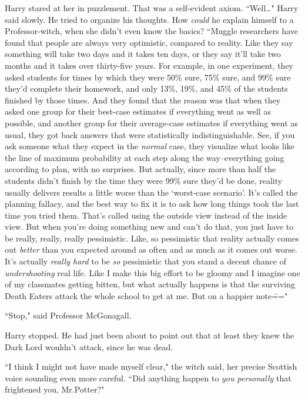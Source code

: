 Harry stared at her in puzzlement. That was a self-evident axiom. ``Well{\ldots}" Harry said slowly. He tried to organize his thoughts. How \emph{could} he explain himself to a Professor-witch, when she didn't even know the basics? ``Muggle researchers have found that people are always very optimistic, compared to reality. Like they say something will take two days and it takes ten days, or they say it'll take two months and it takes over thirty-five years. For example, in one experiment, they asked students for times by which they were 50\% sure, 75\% sure, and 99\% sure they'd complete their homework, and only 13\%, 19\%, and 45\% of the students finished by those times. And they found that the reason was that when they asked one group for their best-case estimates if everything went as well as possible, and another group for their average-case estimates if everything went as usual, they got back answers that were statistically indistinguishable. See, if you ask someone what they expect in the \emph{normal} case, they visualize what looks like the line of maximum probability at each step along the way\---everything going according to plan, with no surprises. But actually, since more than half the students didn't finish by the time they were 99\% sure they'd be done, reality usually delivers results a little worse than the `worst-case scenario'. It's called the planning fallacy, and the best way to fix it is to ask how long things took the last time you tried them. That's called using the outside view instead of the inside view. But when you're doing something new and can't do that, you just have to be really, really, really pessimistic. Like, so pessimistic that reality actually comes out \emph{better} than you expected around as often and as much as it comes out worse. It's actually \emph{really hard} to be \emph{so} pessimistic that you stand a decent chance of \emph{undershooting} real life. Like I make this big effort to be gloomy and I imagine one of my classmates getting bitten, but what actually happens is that the surviving Death Eaters attack the whole school to get at me. But on a happier note\==="

``Stop," said Professor McGonagall.

Harry stopped. He had just been about to point out that at least they knew the Dark Lord wouldn't attack, since he was dead.

``I think I might not have made myself clear," the witch said, her precise Scottish voice sounding even more careful. ``Did anything happen to \emph{you personally} that frightened you, Mr.\?Potter?"

